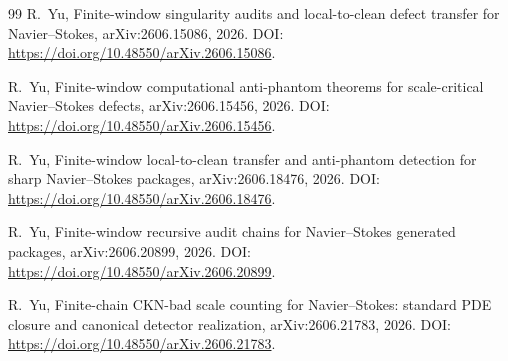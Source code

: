 \documentclass[11pt]{article}
\numberwithin{equation}{section}
\theoremstyle{remark}
\begin{document}
\begin{thebibliography}{99}
R.~Yu,
\newblock Finite-window singularity audits and local-to-clean defect transfer for Navier--Stokes,
\newblock arXiv:2606.15086, 2026.
\newblock DOI: \url{https://doi.org/10.48550/arXiv.2606.15086}.

R.~Yu,
\newblock Finite-window computational anti-phantom theorems for scale-critical Navier--Stokes defects,
\newblock arXiv:2606.15456, 2026.
\newblock DOI: \url{https://doi.org/10.48550/arXiv.2606.15456}.

R.~Yu,
\newblock Finite-window local-to-clean transfer and anti-phantom detection for sharp Navier--Stokes packages,
\newblock arXiv:2606.18476, 2026.
\newblock DOI: \url{https://doi.org/10.48550/arXiv.2606.18476}.

R.~Yu,
\newblock Finite-window recursive audit chains for Navier--Stokes generated packages,
\newblock arXiv:2606.20899, 2026.
\newblock DOI: \url{https://doi.org/10.48550/arXiv.2606.20899}.

R.~Yu,
\newblock Finite-chain CKN-bad scale counting for Navier--Stokes: standard PDE closure and canonical detector realization,
\newblock arXiv:2606.21783, 2026.
\newblock DOI: \url{https://doi.org/10.48550/arXiv.2606.21783}.



\end{thebibliography}
\end{document}
